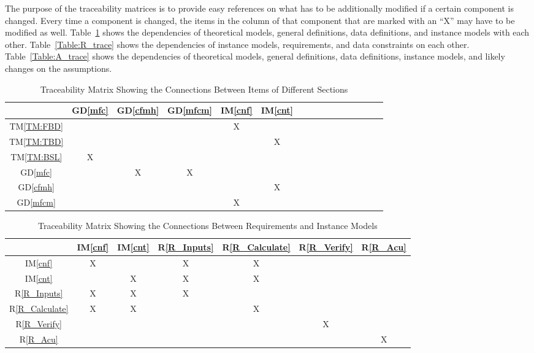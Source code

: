 \documentclass[12pt]{article}
\newcommand{\dref}[1]{GD\ref{#1}}
\newcommand{\tref}[1]{TM\ref{#1}}
\newcommand{\iref}[1]{IM\ref{#1}}
\newcommand{\rref}[1]{R\ref{#1}}
\begin{document}
The purpose of the traceability matrices is to provide easy references on what
has to be additionally modified if a certain component is changed.  Every time a
component is changed, the items in the column of that component that are marked
with an ``X'' may have to be modified as well.  Table~\ref{Table:trace} shows the
dependencies of theoretical models, general definitions, data definitions, and
instance models with each other. Table~\ref{Table:R_trace} shows the
dependencies of instance models, requirements, and data constraints on each
other. Table~\ref{Table:A_trace} shows the dependencies of theoretical models,
general definitions, data definitions, instance models, and likely changes on
the assumptions.

\begin{table}[H]
\centering
\begin{tabular}{|c|c|c|c|c|c|c|c|c|c|c|c|c|c|c|c|}
\hline        
& \dref{mfc}&\dref{cfmh} &\dref{mfcm} & \iref{cnf}& \iref{cnt} \\
\hline
\tref{TM:FBD}   & & & & X&  \\ \hline
\tref{TM:TBD}   & & & & & X \\ \hline
\tref{TM:BSL}   & X& & & & \\ \hline
\dref{mfc}      & &  X& X& &  \\ \hline
\dref{cfmh}     & & & & & X \\ \hline
\dref{mfcm}     & & & & X&  \\ \hline
\end{tabular}
\caption{Traceability Matrix Showing the Connections Between Items of Different Sections}
\label{Table:trace}
\end{table}

\begin{table}[H]
\centering
\begin{tabular}{|c|c|c|c|c|c|c|}
\hline
 & \iref{cnf} & \iref{cnt} & \rref{R_Inputs} & \rref{R_Calculate} & \rref{R_Verify} & \rref{R_Acu} \\ \hline
\iref{cnf}          & X   &   &X   &X   &    &    \\ \hline
\iref{cnt}          &     &X  &X   &X   &    &    \\ \hline
\rref{R_Inputs}     &X    &X  &X   &    &    &    \\ \hline
\rref{R_Calculate}  &X    &X  &    &X   &    &    \\ \hline
\rref{R_Verify}     &     &   &    &    &X   &    \\ \hline
\rref{R_Acu}        &     &   &    &    &    &X   \\ \hline
\end{tabular}
\caption{Traceability Matrix Showing the Connections Between Requirements and Instance Models}
\end{table}
\end{document}
